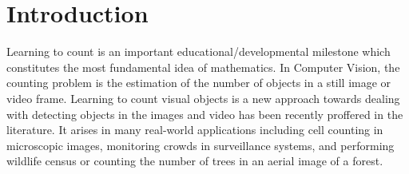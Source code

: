 \chapter{Introduction}
\label{sec:introduction}




Learning to count is an important educational/developmental milestone which constitutes the most fundamental idea of mathematics\cite{wikicounting}. In Computer Vision, the counting problem is the estimation of the number of objects in a still image or video frame. Learning to count visual objects is a new approach towards dealing with detecting objects in the images and video has been recently proffered in the literature. It arises in many real-world applications including cell counting in microscopic images, monitoring crowds in surveillance systems, and performing wildlife census or counting the number of trees in an aerial image of a forest\cite{NIPS2010_4043}. 











